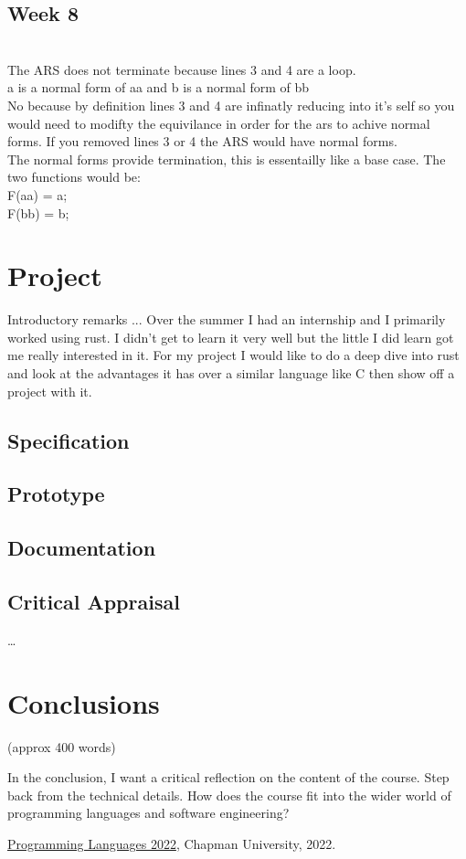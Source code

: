 \documentclass{article}
\theoremstyle{theorem}
\theoremstyle{definition}
\theoremstyle{remark}
\begin{document}
\subsection{Week 8}
\\The ARS does not terminate because lines 3 and 4 are a loop.
\\a is a normal form of aa and b is a normal form of bb
\\No because by definition lines 3 and 4 are infinatly reducing into it's self so you would need to modifty the equivilance in order for the ars to achive normal forms. If you removed lines 3 or 4 the ARS would have normal forms.
\\The normal forms provide termination, this is essentailly like a base case. The two functions would be:
\\F(aa) = a;
\\F(bb) = b;

\section{Project}
Introductory remarks ...
Over the summer I had an internship and I primarily worked using rust. I didn't get to learn it very well but the little I did learn got me really interested in it. For my project I would like to do a deep dive into rust and look at the advantages it has over a similar language like C then show off a project with it.

\subsection{Specification}
\subsection{Prototype}
\subsection{Documentation}
\subsection{Critical Appraisal}

\ldots

\section{Conclusions}\label{conclusions}

(approx 400 words)

In the conclusion, I want a critical reflection on the content of the course. Step back from the technical details. How does the course fit into the wider world of programming languages and software engineering?

\begin{thebibliography}{99}
 \href{https://github.com/alexhkurz/programming-languages-2022/blob/main/README.md}{Programming Languages 2022}, Chapman University, 2022.
\end{thebibliography}
\end{document}
